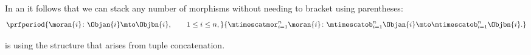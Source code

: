 \begin{remark}
    In an    it follows that we can stack any number of morphisms without needing to bracket using parentheses:
    \begin{equation}
        \prfperiod{
            \moran{i} \colon \Objan{i} \mto \Objbn{i}, \qquad 1 \leq i \leq n,
        }{
            \mtimescatmor_{i=1}^n \moran{i} \colon  \mtimescatob_{i=1}^n \Objan{i} \mto \mtimescatob_{i=1}^n \Objbn{i}.
        }
    \end{equation}
\end{remark}
\clearpage
\begin{lemma}
    \label{lem:SetL-is-associative-stacking}
    \SetL is   using the structure that arises from tuple concatenation.
\end{lemma}
